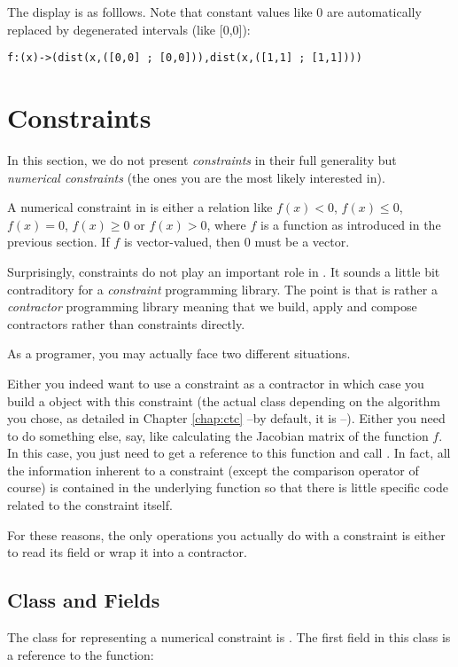 The display is as folllows. Note that constant values like 0 are automatically replaced
by degenerated intervals (like [0,0]):
\begin{verbatim}
f:(x)->(dist(x,([0,0] ; [0,0])),dist(x,([1,1] ; [1,1])))
\end{verbatim}

\section{Constraints}

In this section, we do not present {\it constraints} in their full generality
but {\it numerical constraints} (the ones you are the most likely interested in).

A numerical constraint in \ibex is either a relation like 
$f(x)<0$, $f(x)\le0$, $f(x)=0$, $f(x)\ge0$ or $f(x)>0$,
where $f$ is a function as introduced in the previous section. If $f$ is vector-valued, then
$0$ must be a vector.

Surprisingly, constraints do not play an important role in \ibex.
It sounds a little bit contraditory for a {\it constraint} programming library.
The point is that \ibex is rather a {\it contractor} programming library meaning that 
we build, apply and compose contractors rather than constraints directly.

As a programer, you may actually face two different situations.

Either you indeed want to use a constraint as a contractor in which case you
build a  object with this constraint (the actual class depending
on the algorithm you chose, as detailed in Chapter \ref{chap:ctc} --by default, it is --).
Either you need to do something else, say, like calculating the Jacobian matrix of the
function $f$. In this case, you just need to get a reference to this function 
and call . In fact, all the information inherent to a constraint
(except the comparison operator of course) is contained in the underlying function so that there
is little specific code related to the constraint itself.

For these reasons, the only operations you actually do with a constraint is either
to read its field or wrap it into a contractor.

\subsection{Class and Fields}

The class for representing a numerical constraint is .
The first field in this class is a reference to the function:\\
\centerline{ }

